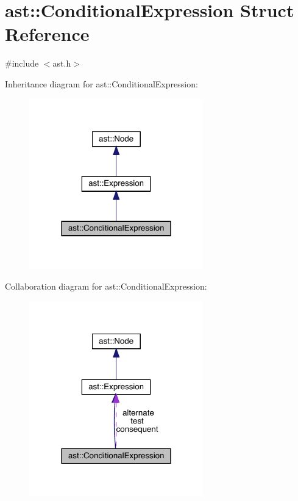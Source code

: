 \hypertarget{structast_1_1_conditional_expression}{}\section{ast\+:\+:Conditional\+Expression Struct Reference}
\label{structast_1_1_conditional_expression}


{\ttfamily \#include $<$ast.\+h$>$}



Inheritance diagram for ast\+:\+:Conditional\+Expression\+:\nopagebreak
\begin{figure}[H]
\begin{center}
\leavevmode
\includegraphics[width=214pt]{structast_1_1_conditional_expression__inherit__graph}
\end{center}
\end{figure}


Collaboration diagram for ast\+:\+:Conditional\+Expression\+:\nopagebreak
\begin{figure}[H]
\begin{center}
\leavevmode
\includegraphics[width=214pt]{structast_1_1_conditional_expression__coll__graph}
\end{center}
\end{figure}
